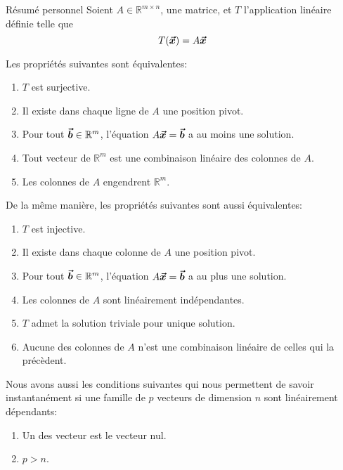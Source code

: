 \documentclass[a4paper]{article}
\begin{document}
\begin{parag}{Résumé personnel}
    Soient $A \in \mathbb{R}^{m \times n}$, une matrice, et $T$ l'application linéaire définie telle que
    \[T\left(\bvec{x}\right) = A \bvec{x}\]

    Les propriétés suivantes sont équivalentes:
    \begin{enumerate}
        \item $T$ est surjective.
        \item Il existe dans chaque ligne de $A$ une position pivot.
        \item Pour tout $\bm{\protect\vec{b}} \in \mathbb{R}^{m}$, l'équation $A \bm{\protect\vec{x}} = \bm{\protect\vec{b}}$ a au moins une solution.
        \item Tout vecteur de $\mathbb{R}^{m}$ est une combinaison linéaire des colonnes de $A$.
        \item Les colonnes de $A$ engendrent $\mathbb{R}^{m}$.
    \end{enumerate}

    \vspace{1em}
    De la même manière, les propriétés suivantes sont aussi équivalentes:
    \begin{enumerate}
        \item $T$ est injective.
        \item Il existe dans chaque colonne de $A$ une position pivot.
        \item Pour tout $\bm{\protect\vec{b}} \in \mathbb{R}^{m}$, l'équation $A \bm{\protect\vec{x}} = \bm{\protect\vec{b}}$ a au plus une solution.
        \item Les colonnes de $A$ sont linéairement indépendantes.
        \item $T$ admet la solution triviale pour unique solution.
        \item Aucune des colonnes de $A$ n'est une combinaison linéaire de celles qui la précèdent.
    \end{enumerate}

    \vspace{1em}
    Nous avons aussi les conditions suivantes qui nous permettent de savoir instantanément si une famille de $p$ vecteurs de dimension $n$ sont linéairement dépendants:
    \begin{enumerate}
        \item Un des vecteur est le vecteur nul.
        \item $p > n$.
    \end{enumerate}

\end{parag}
\end{document}
